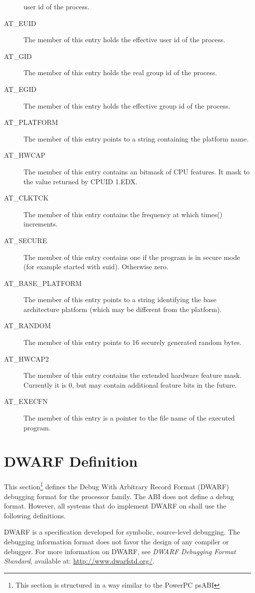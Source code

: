 \begin{description}
  user id of the process.
\item[AT_EUID] The  member of this entry holds the
  effective user id of the process.
\item[AT_GID] The  member of this entry holds the
  real group id of the process.
\item[AT_EGID] The  member of this entry holds the
  effective group id of the process.
\item[AT_PLATFORM] The  member of this entry points to
  a string containing the platform name.
\item[AT_HWCAP] The  member of this entry contains an bitmask
  of CPU features. It mask to the value returned by CPUID 1.EDX.
\item[AT_CLKTCK] The  member of this entry contains the
  frequency at which times() increments.
\item[AT_SECURE] The  member of this entry contains one
  if the program is in secure mode (for example started with suid).
  Otherwise zero.
\item[AT_BASE_PLATFORM] The  member of this entry points to
  a string identifying the base architecture platform (which may be different
  from the platform).
\item[AT_RANDOM] The  member of this entry points to 16 securely
  generated random bytes.
\item[AT_HWCAP2] The  member of this entry contains the extended
  hardware feature mask. Currently it is 0, but may contain additional feature
  bits in the future.
\item[AT_EXECFN] The  member of this entry is a pointer to the
  file name of the executed program.
\end{description}


\section{DWARF Definition}

This section\footnote{This section is structured in a way similar to
  the PowerPC psABI}
defines the Debug With Arbitrary Record Format (DWARF) debugging
format for the \xARCH processor family. The \xARCH ABI does not define
a debug format.  However, all systems that do implement DWARF on \xARCH shall
use the following definitions.

DWARF is a specification developed for symbolic, source-level debugging.
The debugging information format does not favor the design of any
compiler or debugger.  For more information on DWARF,
see \emph{DWARF Debugging Format Standard},
available at: \url{http://www.dwarfstd.org/}.

